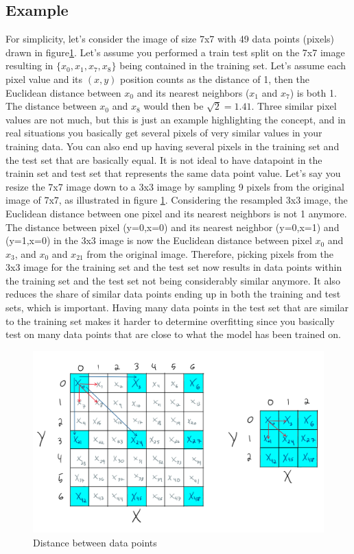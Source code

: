 \documentclass[11pt, a4paper]{article}
\begin{document}
\subsection*{Example}
For simplicity, let’s consider the image of size 7x7
with 49 data points (pixels) drawn in figure\ref{fig:image_resizing}. Let's assume you performed a train test split on the 7x7 image resulting in $\{x_0,x_1,x_7,x_8\}$ being contained in the
training set. Let's assume each pixel value and its $(x,y)$ position counts as the distance of 1, then the Euclidean distance between $x_0$ and its nearest neighbors ($x_1$ and $x_7$) is both 1.
The distance between $x_0$ and $x_8$ would then be $\sqrt{2}=1.41$.
Three similar pixel values are not much, but this is just an example highlighting the concept, and in real situations you basically get several pixels of very similar values in your training data.
You can also end up having several pixels in the training set and the test set that are basically equal. It is not ideal to have datapoint in the trainin set and test set that represents the same data point value.
Let’s say you resize the 7x7 image down to a 3x3 image by sampling 9 pixels from the original image of 7x7, as illustrated in figure \ref{fig:image_resizing}. Considering the resampled 3x3 image,
the Euclidean distance between one pixel and its nearest neighbors is not 1 anymore. The distance between pixel (y=0,x=0) and its nearest neighbor (y=0,x=1) and (y=1,x=0)
in the 3x3 image is now the Euclidean distance between pixel $x_0$ and $x_3$, and $x_0$ and $x_{21}$ from the original image. Therefore, picking pixels from the 3x3 image for the training
set and the test set now results in data points within the training set and the test set not being considerably similar anymore. It also reduces the share of similar data
points ending up in both the training and test sets, which is important. Having many data points in the test set that are similar to the training set makes it harder to
determine overfitting since you basically test on many data points that are close to what the model has been trained on.
\begin{figure}
  \centering
  \includegraphics[scale=0.28]{figures/EX6_resizing.png}
  \caption{Distance between data points}
  \label{fig:image_resizing}
\end{figure}
\end{document}

